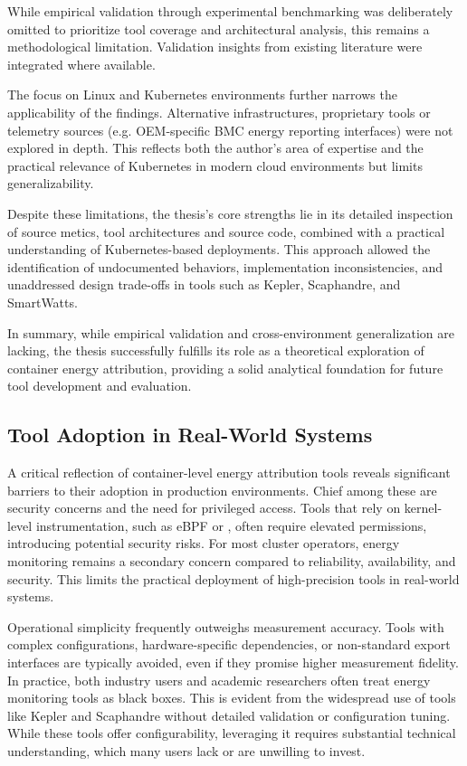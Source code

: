 While empirical validation through experimental benchmarking was deliberately omitted to prioritize tool coverage and architectural analysis, this remains a methodological limitation. Validation insights from existing literature were integrated where available.

The focus on Linux and Kubernetes environments further narrows the applicability of the findings. Alternative infrastructures, proprietary tools or telemetry sources (e.g. OEM-specific BMC energy reporting interfaces) were not explored in depth. This reflects both the author's area of expertise and the practical relevance of Kubernetes in modern cloud environments but limits generalizability.

Despite these limitations, the thesis’s core strengths lie in its detailed inspection of source metics, tool architectures and source code, combined with a practical understanding of Kubernetes-based deployments. This approach allowed the identification of undocumented behaviors, implementation inconsistencies, and unaddressed design trade-offs in tools such as Kepler, Scaphandre, and SmartWatts.

In summary, while empirical validation and cross-environment generalization are lacking, the thesis successfully fulfills its role as a theoretical exploration of container energy attribution, providing a solid analytical foundation for future tool development and evaluation.

\subsection{Tool Adoption in Real-World Systems}

A critical reflection of container-level energy attribution tools reveals significant barriers to their adoption in production environments. Chief among these are security concerns and the need for privileged access. Tools that rely on kernel-level instrumentation, such as eBPF or , often require elevated permissions, introducing potential security risks. For most cluster operators, energy monitoring remains a secondary concern compared to reliability, availability, and security. This limits the practical deployment of high-precision tools in real-world systems.

Operational simplicity frequently outweighs measurement accuracy. Tools with complex configurations, hardware-specific dependencies, or non-standard export interfaces are typically avoided, even if they promise higher measurement fidelity. In practice, both industry users and academic researchers often treat energy monitoring tools as black boxes. This is evident from the widespread use of tools like Kepler and Scaphandre without detailed validation or configuration tuning. While these tools offer configurability, leveraging it requires substantial technical understanding, which many users lack or are unwilling to invest.

